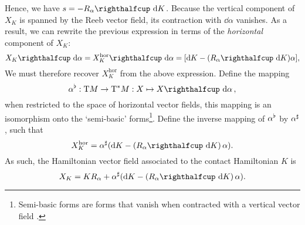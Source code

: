 Hence, we have \(s = -\intpr{R_\alpha}{\dd{K}}\). Because the vertical component of \(X_K\) is spanned by the Reeb vector field, its contraction with \(\dd{\alpha}\) vanishes. As a result, we can rewrite the previous expression in terms of the \emph{horizontal} component of \(X_K\):
\begin{equation}
    \intpr{X_K}{\dd{\alpha}} = \intpr{X_K^\text{hor}}{\dd{\alpha}}=  \qty[\dd{K} - \qty(\intpr{R_\alpha}{\dd{K}})\alpha], 
    \label{eq:basic_form}
\end{equation}
We must therefore recover \(X^\text{hor}_K\) from the above expression. Define the mapping  
\begin{equation}
     \toDual{\alpha}: \tbundle{M} \to \ctbundle{M}: X \mapsto  \intpr{X}{\dd{\alpha}},
\end{equation}
when restricted to the space of horizontal vector fields, this mapping is an isomorphism onto the `semi-basic' forms\footnote{Semi-basic forms are forms that vanish when contracted with a vertical vector field \cite{Libermann1987}.}. Define the inverse mapping of \(\alpha^\flat\) by \(\alpha^\sharp\), such that
\begin{equation}
     X_K^\text{hor} = \fromDual{\alpha}\qty(\dd{K} - \qty(\intpr{R_\alpha}{\dd{K}})\,\alpha).
\end{equation}
As such, the Hamiltonian vector field associated to the contact Hamiltonian \(K\) is
\begin{equation}
    X_K = K R_\alpha + \fromDual{\alpha}(\dd{K} - \qty(\intpr{R_\alpha}{\dd{K}})\,\alpha).
    \label{eq:contact_ham_vf_cofree}
\end{equation}

